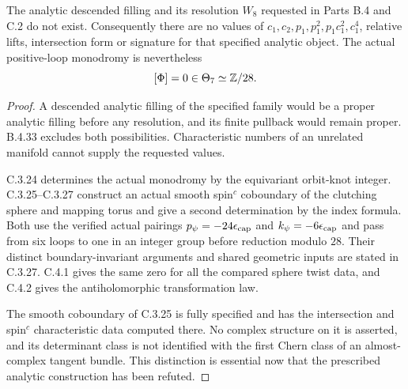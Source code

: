 \begin{corollary}
The analytic descended filling and its resolution $W_8$
requested in Parts B.4 and C.2 do not exist. Consequently
there are no values of $c_1,c_2,p_1,p_1^2,p_1c_1^2,c_1^4$,
relative lifts, intersection form or signature for that
specified analytic object. The actual positive-loop
monodromy is nevertheless
\[
                    [\Phi]=0\in\Theta_7\simeq\mathbb Z/28.
\]
\end{corollary}
\begin{proof}
A descended analytic filling of the specified family
would be a proper analytic filling before any resolution,
and its finite pullback would remain proper. B.4.33
excludes both possibilities. Characteristic numbers of
an unrelated manifold cannot supply the requested values.

C.3.24 determines the actual monodromy by the equivariant
orbit-knot integer. C.3.25--C.3.27 construct an actual
smooth spin$^c$ coboundary of the clutching sphere and
mapping torus and give a second determination by the
index formula. Both use the verified actual pairings
$p_\psi=-24\epsilon_{\rm cap}$ and
$k_\psi=-6\epsilon_{\rm cap}$ and pass from six loops
to one in an integer group before reduction modulo $28$.
Their distinct boundary-invariant arguments and shared
geometric inputs are stated in C.3.27. C.4.1 gives the
same zero for all the compared sphere twist data, and
C.4.2 gives the antiholomorphic transformation law.

The smooth coboundary of C.3.25 is fully specified and
has the intersection and spin$^c$ characteristic data
computed there. No complex structure on it is asserted,
and its determinant class is not identified with the first
Chern class of an almost-complex tangent bundle. This
distinction is essential now that the prescribed analytic
construction has been refuted.
\end{proof}
